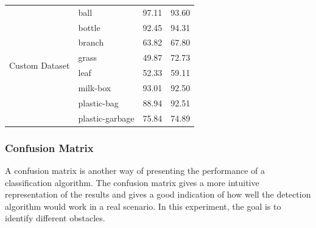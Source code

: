 \documentclass[sensors,article,submit,moreauthors,pdftex]{Definitions/mdpi}
\begin{document}
\begin{paracol}{2}
\begin{table}[htbp]
\begin{tabular}{llcc}
\multirow{8}{*}{Custom Dataset} 
& ball& 97.11  & 93.60 \\
& bottle & 92.45 & 94.31  \\
& branch & 63.82 & 67.80 \\
& grass & 49.87 & 72.73  \\
& leaf & 52.33 & 59.11 \\
& milk-box  & 93.01 & 92.50 \\
& plastic-bag & 88.94 & 92.51 \\
& plastic-garbage & 75.84 & 74.89 \\

\bottomrule
\end{tabular}
\label{tbl:Comparison of AP in different dataset}
\end{table}

\subsubsection{Confusion Matrix}
A confusion matrix is another way of presenting the performance of a classification algorithm. The confusion matrix gives a more intuitive representation of the results and gives a good indication of how well the detection algorithm would work in a real scenario. In this experiment, the goal is to identify different obstacles.


\end{paracol}
\end{document}
